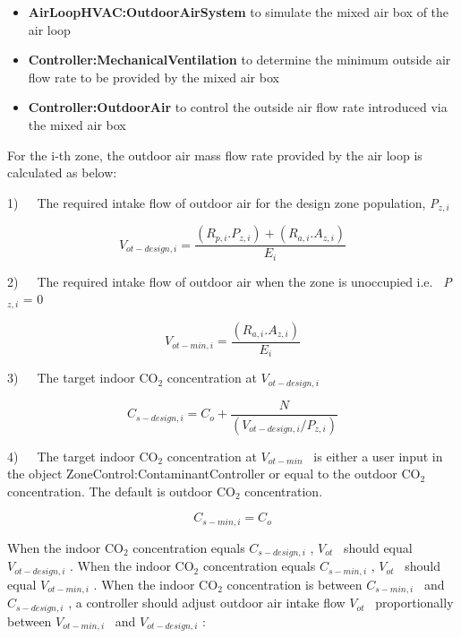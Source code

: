 \begin{itemize}
  \item \textbf{AirLoopHVAC:OutdoorAirSystem} to simulate the mixed air box of the air loop
  \item \textbf{Controller:MechanicalVentilation} to determine the minimum outside air flow rate to be provided by the mixed air box
  \item \textbf{Controller:OutdoorAir} to control the outside air flow rate introduced via the mixed air box
\end{itemize}

For the i-th zone, the outdoor air mass flow rate provided by the air loop is calculated as below:

1)~~~The required intake flow of outdoor air for the design zone population, \emph{P\(_{z,i}\)}

\begin{equation}
{V_{ot - design,i}} = \frac{{\left( {{R_{p,i}}.{P_{z,i}}} \right) + ({R_{a,i}}.{A_{z,i}})}}{{{E_i}}}
\end{equation}

2)~~~The required intake flow of outdoor air when the zone is unoccupied i.e.~ \emph{P\(_{z,i}\)} = 0

\begin{equation}
{V_{ot - min,i}} = \frac{{({R_{a,i}}.{A_{z,i}})}}{{{E_i}}}
\end{equation}

3)~~~The target indoor CO\(_{2}\) concentration at \({V_{ot - design,i}}\)

\begin{equation}
{C_{s - design,i}} = {C_o} + \frac{N}{{\left( {{V_{ot - design,i}}/{P_{z,i}}} \right)}}
\end{equation}

4)~~~The target indoor CO\(_{2}\) concentration at \({V_{ot - min}}\) ~is either a user input in the object ZoneControl:ContaminantController or equal to the outdoor CO\(_{2}\) concentration. The default is outdoor CO\(_{2}\) concentration.

\begin{equation}
{C_{s - min,i}} = {C_o}
\end{equation}

When the indoor CO\(_{2}\) concentration equals \({C_{s - design,i}}\) , \({V_{ot}}\) ~should equal \({V_{ot - design,i}}\) . When the indoor CO\(_{2}\) concentration equals \({C_{s - min,i}}\) , \({V_{ot}}\) ~should equal \({V_{ot - min,i}}\) . When the indoor CO\(_{2}\) concentration is between \({C_{s - min,i}}\) ~and \({C_{s - design,i}}\) , a controller should adjust outdoor air intake flow \({V_{ot}}\) ~proportionally between \({V_{ot - min,i}}\) ~and \({V_{ot - design,i}}\) :

